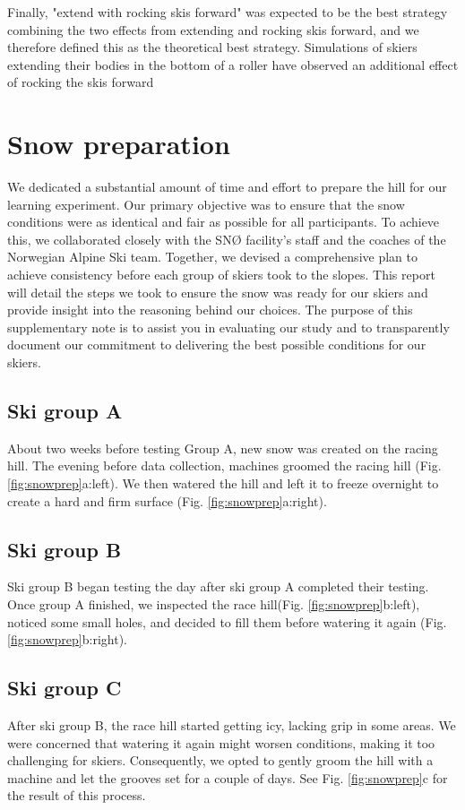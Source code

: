 \documentclass[pdflatex,sn-mathphys-num]{sn-jnl}%
\theoremstyle{thmstyleone}%
\theoremstyle{thmstyletwo}%
\theoremstyle{thmstylethree}%
\begin{document}
\begin{appendices}
Finally, "extend with rocking skis forward" was expected to be the best strategy combining the two effects from extending and rocking skis forward, and we therefore defined this as the theoretical best strategy. Simulations of skiers extending their bodies in the bottom of a roller have observed an additional effect of rocking the skis forward \cite{mote_accelerations_1983}


\section{Snow preparation}\label{sup_snowprep}
We dedicated a substantial amount of time and effort to prepare the hill for our learning experiment. Our primary objective was to ensure that the snow conditions were as identical and fair as possible for all participants. To achieve this, we collaborated closely with the SNØ facility’s staff and the coaches of the Norwegian Alpine Ski team. Together, we devised a comprehensive plan to achieve consistency before each group of skiers took to the slopes. This report will detail the steps we took to ensure the snow was ready for our skiers and provide insight into the reasoning behind our choices. The purpose of this supplementary note is to assist you in evaluating our study and to transparently document our commitment to delivering the best possible conditions for our skiers.

\subsection*{Ski group A}
About two weeks before testing Group A, new snow was created on the racing hill. The evening before data collection, machines groomed the racing hill (Fig. \ref{fig:snowprep}a:left). We then watered the hill and left it to freeze overnight to create a hard and firm surface (Fig. \ref{fig:snowprep}a:right). 

\subsection*{Ski group B}
Ski group B began testing the day after ski group A completed their testing. Once group A finished, we inspected the race hill(Fig. \ref{fig:snowprep}b:left), noticed some small holes, and decided to fill them before watering it again (Fig. \ref{fig:snowprep}b:right).  

\subsection*{Ski group C}
After ski group B, the race hill started getting icy, lacking grip in some areas. We were concerned that watering it again might worsen conditions, making it too challenging for skiers. Consequently, we opted to gently groom the hill with a machine and let the grooves set for a couple of days. See Fig. \ref{fig:snowprep}c for the result of this process.


\end{appendices}
\end{document}
